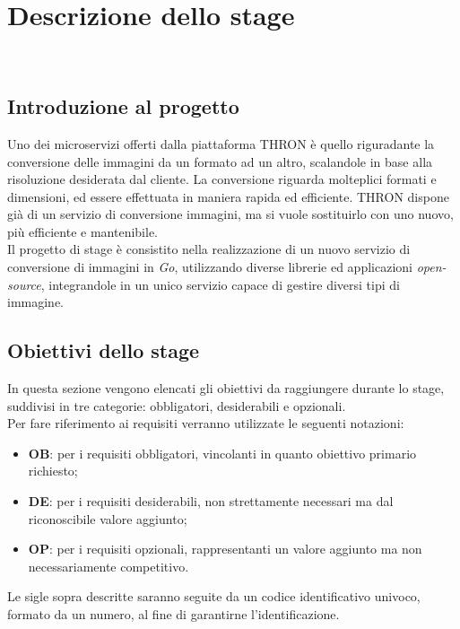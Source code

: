 \chapter{Descrizione dello stage}
\label{cap:descrizione-stage}

\\

\section{Introduzione al progetto}
Uno dei microservizi offerti dalla piattaforma THRON è quello riguradante la
conversione delle immagini da un formato ad un altro, scalandole in base alla
risoluzione desiderata dal cliente. La conversione riguarda molteplici formati
e dimensioni, ed essere effettuata in maniera rapida ed efficiente.
THRON dispone già di un servizio di conversione immagini, ma si vuole
sostituirlo con uno nuovo, più efficiente e mantenibile. \\
Il progetto di stage è consistito nella realizzazione di un nuovo servizio di
conversione di immagini in \emph{Go}, utilizzando diverse librerie ed
applicazioni \emph{\glsfirstoccur\gls{open-source}}, integrandole in un unico servizio
capace di gestire diversi tipi di immagine.\\

\section{Obiettivi dello stage}
\label{sec:obiettivi}
In questa sezione vengono elencati gli obiettivi da raggiungere durante lo
stage, suddivisi in tre categorie: obbligatori, desiderabili e opzionali.\\
Per fare riferimento ai requisiti verranno utilizzate le seguenti notazioni:
\begin{itemize}
    \item \textbf{OB}: per i requisiti obbligatori, vincolanti in quanto obiettivo
          primario richiesto;
    \item \textbf{DE}: per i requisiti desiderabili, non strettamente necessari
          ma dal riconoscibile valore aggiunto;
    \item \textbf{OP}: per i requisiti opzionali, rappresentanti un valore
          aggiunto ma non necessariamente competitivo.
\end{itemize}
Le sigle sopra descritte saranno seguite da un codice identificativo univoco,
formato da un numero, al fine di garantirne l'identificazione.\\
